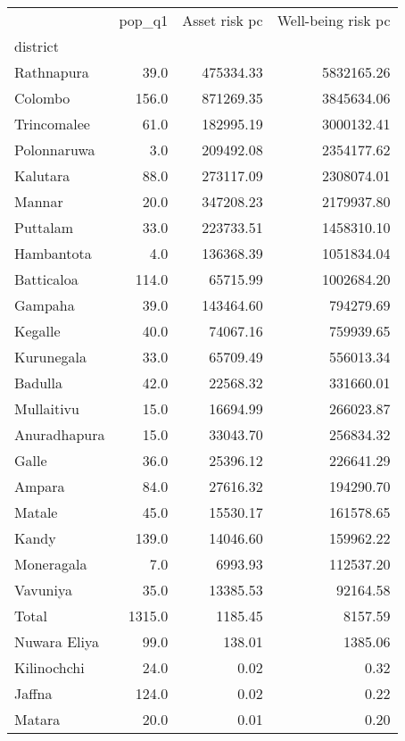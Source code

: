\begin{tabular}{lrrr}
\toprule
{} &  pop\_q1 &  Asset risk pc &  Well-being risk pc \\
district     &         &                &                     \\
\midrule
Rathnapura   &    39.0 &      475334.33 &          5832165.26 \\
Colombo      &   156.0 &      871269.35 &          3845634.06 \\
Trincomalee  &    61.0 &      182995.19 &          3000132.41 \\
Polonnaruwa  &     3.0 &      209492.08 &          2354177.62 \\
Kalutara     &    88.0 &      273117.09 &          2308074.01 \\
Mannar       &    20.0 &      347208.23 &          2179937.80 \\
Puttalam     &    33.0 &      223733.51 &          1458310.10 \\
Hambantota   &     4.0 &      136368.39 &          1051834.04 \\
Batticaloa   &   114.0 &       65715.99 &          1002684.20 \\
Gampaha      &    39.0 &      143464.60 &           794279.69 \\
Kegalle      &    40.0 &       74067.16 &           759939.65 \\
Kurunegala   &    33.0 &       65709.49 &           556013.34 \\
Badulla      &    42.0 &       22568.32 &           331660.01 \\
Mullaitivu   &    15.0 &       16694.99 &           266023.87 \\
Anuradhapura &    15.0 &       33043.70 &           256834.32 \\
Galle        &    36.0 &       25396.12 &           226641.29 \\
Ampara       &    84.0 &       27616.32 &           194290.70 \\
Matale       &    45.0 &       15530.17 &           161578.65 \\
Kandy        &   139.0 &       14046.60 &           159962.22 \\
Moneragala   &     7.0 &        6993.93 &           112537.20 \\
Vavuniya     &    35.0 &       13385.53 &            92164.58 \\
Total        &  1315.0 &        1185.45 &             8157.59 \\
Nuwara Eliya &    99.0 &         138.01 &             1385.06 \\
Kilinochchi  &    24.0 &           0.02 &                0.32 \\
Jaffna       &   124.0 &           0.02 &                0.22 \\
Matara       &    20.0 &           0.01 &                0.20 \\
\bottomrule
\end{tabular}
